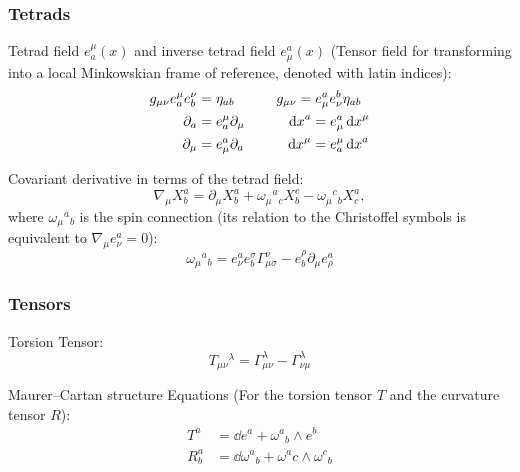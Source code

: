		\subsubsection{Tetrads}
			Tetrad field $e_a^\mu(x)$ and inverse tetrad field $e_\mu^a(x)$ (Tensor field for transforming into a local Minkowskian frame of reference, denoted with latin indices):
			\begin{equation}
				\begin{aligned}
					g_{\mu\nu} e_a^\mu e_b^\nu &= \eta_{ab}
					\hspace{30pt} g_{\mu\nu} = e^a_\mu e^b_\nu \eta_{ab} \\
					\partial_a &= e_a^\mu \partial_\mu
					\hspace{30pt} \dd{x}^a = e^a_\mu \dd{x}^\mu \\
					\partial_\mu &= e_\mu^a \partial_a
					\hspace{30pt} \dd{x}^\mu = e^\mu_a \dd{x}^a
				\end{aligned}
			\end{equation}

			\noindent
			Covariant derivative in terms of the tetrad field:
			\begin{equation}
				\nabla_\mu X^a_b = \partial_\mu X^a_b + \omega_\mu{}^a{}_c X^c_b - \omega_\mu{}^c{}_b X^a_c,
			\end{equation}
			where $\omega_\mu{}^a{}_b$ is the spin connection (its relation to the Christoffel symbols is equivalent to $\nabla_\mu e^a_\nu = 0$):
			\begin{equation}
				\omega_\mu{}^a{}_b = e^a_\nu e^\sigma_b \Gamma^\nu_{\mu\sigma} - e^\rho_b \partial_\mu e^a_\rho
			\end{equation}


		\subsubsection{Tensors}
			Torsion Tensor:
			\begin{equation}
				T_{\mu\nu}{}^\lambda = \Gamma_{\mu\nu}^\lambda - \Gamma_{\nu\mu}^\lambda
			\end{equation}

			\noindent
			Maurer--Cartan structure Equations (For the torsion tensor $T$ and the curvature tensor $R$):
			\begin{equation}
				\begin{aligned}
					T^a &= \dd e^a + \omega^a{}_b \wedge e^b \\
					R^a_b &= \dd \omega^a{}_b + \omega^a_{}c \wedge \omega^c{}_b
				\end{aligned}
			\end{equation}

